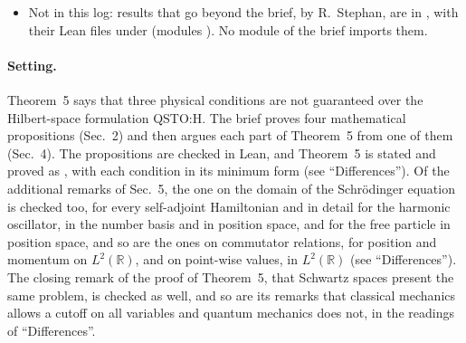 \documentclass[11pt]{article}
\begin{document}
\begin{itemize}
  (module ). It does not import the main file. It
  imports two new  files:\newline
  \newline (measures
  concentrated on a compact set: integrability, continuity of expectations, images),\newline
   (a function and its Fourier transform
  cannot both have bounded support),\newline
  the second with the TauCeti file
   (uniqueness of Fourier coefficients on an
  interval).\newline
  It is kept out of the comparator lane, which stays unchanged.
\item Not in this log: results that go beyond the brief, by R.~Stephan, are in
  , with their Lean files under
   (modules
  ). No module of the brief imports them.
\end{itemize}

\paragraph{Setting.} Theorem~5 says that three physical conditions are not guaranteed over
the Hilbert-space formulation QSTO:H. The brief proves four mathematical propositions (Sec.~2) and
then argues each part of Theorem~5 from one of them (Sec.~4). The propositions are checked in
Lean, and Theorem~5 is stated and proved as , with each condition in its
minimum form (see ``Differences''). Of the additional remarks of
Sec.~5, the one on the domain of the Schr\"odinger equation is checked too, for every
self-adjoint Hamiltonian and in detail for the harmonic oscillator, in the number basis and in
position space, and for the free particle in position space, and so are the
ones on commutator relations, for position and momentum on $L^2(\mathbb{R})$, and on
point-wise values, in $L^2(\mathbb{R})$ (see ``Differences''). The closing remark of the proof
of Theorem~5, that Schwartz spaces present the same problem, is checked as well, and so are
its remarks that classical mechanics allows a cutoff on all variables and quantum mechanics
does not, in the readings of ``Differences''.
\end{document}
